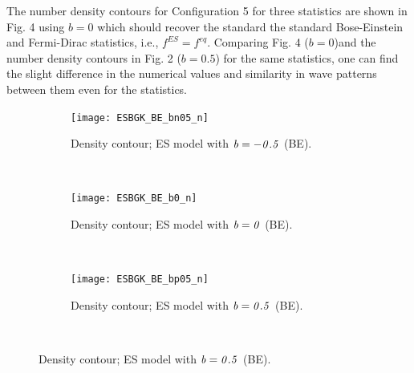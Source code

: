 \documentclass{rsproca}%
\begin{document}
The number density contours for Configuration 5 for three statistics are shown in Fig. 4 using $b=0$ which should recover the standard the standard Bose-Einstein and Fermi-Dirac statistics, i.e., $f^{ES}= f^{eq}$.  Comparing Fig. 4 ($b=0$)and the number density contours in Fig. 2 ($b=0.5$) for the same statistics, one can find the slight difference in the numerical values and similarity in wave patterns between them even for the statistics.

\begin{figure}
        \centering
        \begin{subfigure}[b]{0.32\textwidth}
                \centering
                \texttt{[image: ESBGK\_BE\_bn05\_n]}
                \caption{Density contour; ES model with $\it{b=-0.5}$ (BE).}
                \label{fig:ESBGK_BE_bn05_n}
        \end{subfigure}%
        ~ %
        \begin{subfigure}[b]{0.32\textwidth}
                \centering
                \texttt{[image: ESBGK\_BE\_b0\_n]}
                \caption{Density contour; ES model with $\it{b=0}$ (BE).}
                \label{fig:ESBGK_BE_b0_n}
        \end{subfigure}
        ~ %
        \begin{subfigure}[b]{0.32\textwidth}
                \centering
                \texttt{[image: ESBGK\_BE\_bp05\_n]}
                \caption{Density contour; ES model with $\it{b=0.5}$ (BE).}
                \label{fig:ESBGK_BE_bp05_n}
        \end{subfigure}
				~ %

\end{figure}
\end{document}
